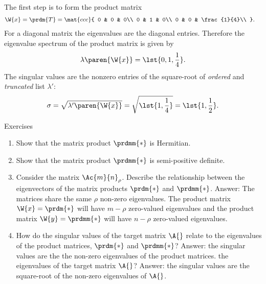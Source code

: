 The first step is to form the product matrix
\begin{equation}
\begin{split}
  \W{x} = \prdm{T} &=  
  \mat{ccc}
  {
  0 & 0 & 0\\
  0 & 1 & 0\\
  0 & 0 & \frac{1}{4}\\
  }.
\end{split}
\end{equation}
For a diagonal matrix the eigenvalues are the diagonal entries. Therefore the eigenvalue spectrum of the product matrix is given by
\begin{equation}
  \lambda\paren{\W{x}} = \lst{0,1,\frac{1}{4}}.
\end{equation}
The singular values are the nonzero entries of the square-root of \textit{ordered} and \textit{truncated} list $\lambda'$:
\begin{equation}
  \sigma=\sqrt{\lambda'\paren{\W{x}}} = \sqrt{\lst{1,\frac{1}{4}}} = \lst{1,\frac{1}{2}}.
\end{equation}
\clearpage

\begin{xcb}{Exercises}
\begin{enumerate}
\item Show that the matrix product $\prdmm{*}$ is Hermitian.
\item Show that the matrix product $\prdmm{*}$ is semi-positive definite.
\item Consider the matrix $\Ac{m}{n}_{\rho}$. Describe the relationship between the eigenvectors of the matrix products $\prdm{*}$ and $\prdmm{*}$.
\subitem Answer: The matrices share the same $\rho$ non-zero eigenvalues. The product matrix $\W{x} = \prdm{*}$ will have $m-\rho$ zero-valued eigenvalues and the product matrix $\W{y} = \prdmm{*}$ will have $n-\rho$ zero-valued eigenvalues.
\item How do the singular values of the target matrix $\A{}$ relate to 
\subitem the eigenvalues of the product matrices, $\prdm{*}$ and $\prdmm{*}$?
\subitem Answer: the singular values are the the non-zero eigenvalues of the product matrices.
\subitem the eigenvalues of the target matrix $\A{}$? 
\subitem Answer: the singular values are the square-root of the non-zero eigenvalues of $\A{}$.
\end{enumerate}

\end{xcb}


\endinput